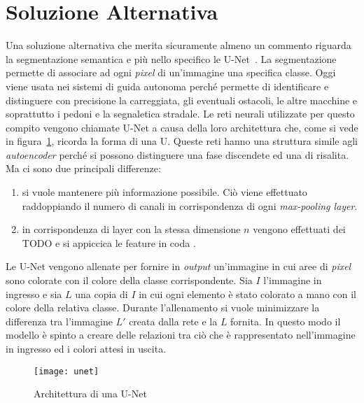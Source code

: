 \section{Soluzione Alternativa}
Una soluzione alternativa che merita  sicuramente almeno un commento riguarda la segmentazione semantica e più nello specifico le U-Net~\cite{unet}.
La segmentazione permette di associare ad ogni \textit{pixel} di un'immagine una specifica classe.
Oggi viene usata nei sistemi di guida autonoma perché permette di identificare e distinguere con precisione la carreggiata, gli eventuali ostacoli, le altre macchine e soprattutto i pedoni e la segnaletica stradale.
Le reti neurali utilizzate per questo compito vengono chiamate U-Net a causa della loro architettura che, come si vede in figura~\ref{fig:unet}, ricorda la forma di una U.
Queste reti hanno una struttura simile agli \textit{autoencoder} perché si possono distinguere una fase discendete ed una di risalita.
Ma ci sono due principali differenze:
\begin{enumerate}
  \item si vuole mantenere più informazione possibile.
    Ciò viene effettuato raddoppiando il numero di canali in corrispondenza di ogni \textit{max-pooling layer}.

  \item in corrispondenza di layer con la stessa dimensione $n$ vengono effettuati dei TODO e si appiccica le feature in coda .

\end{enumerate}
Le U-Net vengono allenate per fornire in \textit{output} un'immagine in cui aree di \textit{pixel} sono colorate con il colore della classe corrispondente.
Sia $I$ l'immagine in ingresso e sia $L$ una copia di $I$ in cui ogni elemento è stato colorato a mano con il colore della relativa classe.
Durante l'allenamento si vuole minimizzare la differenza tra l'immagine $L'$ creata dalla rete e la $L$ fornita.
In questo modo il modello è spinto a creare delle relazioni tra ciò che è rappresentato nell'immagine in ingresso ed i colori attesi in uscita.

\begin{figure}[ht]
  \begin{center}
    \texttt{[image: unet]}
    \caption{Architettura di una U-Net}
    \label{fig:unet}
  \end{center}
\end{figure}

